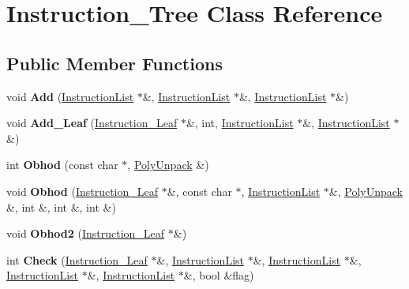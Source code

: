 \hypertarget{classInstruction__Tree}{
\section{Instruction\_\-Tree Class Reference}
\label{classInstruction__Tree}
}
\subsection*{Public Member Functions}
\begin{DoxyCompactItemize}
\item 
\hypertarget{classInstruction__Tree_af6984c818a0944ed8d4b2d0b9d9ec6d6}{
void {\bfseries Add} (\hyperlink{structInstructionList}{InstructionList} $\ast$\&, \hyperlink{structInstructionList}{InstructionList} $\ast$\&, \hyperlink{structInstructionList}{InstructionList} $\ast$\&)}
\label{classInstruction__Tree_af6984c818a0944ed8d4b2d0b9d9ec6d6}

\item 
\hypertarget{classInstruction__Tree_aad648a9a8074aeafbf78e9c828afd048}{
void {\bfseries Add\_\-Leaf} (\hyperlink{structInstruction__Leaf}{Instruction\_\-Leaf} $\ast$\&, int, \hyperlink{structInstructionList}{InstructionList} $\ast$\&, \hyperlink{structInstructionList}{InstructionList} $\ast$\&)}
\label{classInstruction__Tree_aad648a9a8074aeafbf78e9c828afd048}

\item 
\hypertarget{classInstruction__Tree_a226966bee997b0565500106dc2e567d2}{
int {\bfseries Obhod} (const char $\ast$, \hyperlink{classPolyUnpack}{PolyUnpack} \&)}
\label{classInstruction__Tree_a226966bee997b0565500106dc2e567d2}

\item 
\hypertarget{classInstruction__Tree_acedea0a0f4812fe9ce27cac32d69c479}{
void {\bfseries Obhod} (\hyperlink{structInstruction__Leaf}{Instruction\_\-Leaf} $\ast$\&, const char $\ast$, \hyperlink{structInstructionList}{InstructionList} $\ast$\&, \hyperlink{classPolyUnpack}{PolyUnpack} \&, int \&, int \&, int \&)}
\label{classInstruction__Tree_acedea0a0f4812fe9ce27cac32d69c479}

\item 
\hypertarget{classInstruction__Tree_a1e067a81a558de827a34cc0e302ac5f6}{
void {\bfseries Obhod2} (\hyperlink{structInstruction__Leaf}{Instruction\_\-Leaf} $\ast$\&)}
\label{classInstruction__Tree_a1e067a81a558de827a34cc0e302ac5f6}

\item 
\hypertarget{classInstruction__Tree_a3342c7b010e7760be6034ca09efd97f8}{
int {\bfseries Check} (\hyperlink{structInstruction__Leaf}{Instruction\_\-Leaf} $\ast$\&, \hyperlink{structInstructionList}{InstructionList} $\ast$\&, \hyperlink{structInstructionList}{InstructionList} $\ast$\&, \hyperlink{structInstructionList}{InstructionList} $\ast$\&, \hyperlink{structInstructionList}{InstructionList} $\ast$\&, bool \&flag)}
\label{classInstruction__Tree_a3342c7b010e7760be6034ca09efd97f8}


\end{DoxyCompactItemize}
